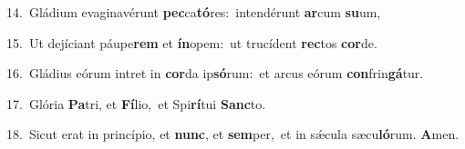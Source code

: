 {\numbfont\textcolor{\numbcolor}{14.}}~Gládium evaginavérunt \textbf{pec}\-ca\-\textbf{tó}\-res:~\star intendérunt \textbf{ar}\-cum \textbf{su}\-um,\par
{\numbfont\textcolor{\numbcolor}{15.}}~Ut dejíciant páupe\textbf{rem} et \textbf{ín}\-opem:~\star ut trucídent \textbf{rec}\-tos \textbf{cor}\-de.\par
{\numbfont\textcolor{\numbcolor}{16.}}~Gládius eórum intret in \textbf{cor}\-da ip\-\textbf{só}\-rum:~\star et arcus eórum \textbf{con}\-frin\-\textbf{gá}\-tur.\par
{\numbfont\textcolor{\numbcolor}{17.}}~Glória \textbf{Pa}\-tri, et \textbf{Fí}\-lio,~\star et Spi\-\textbf{rí}\-tui \textbf{Sanc}\-to.\par
{\numbfont\textcolor{\numbcolor}{18.}}~Sicut erat in princípio, et \textbf{nunc}\-, et \textbf{sem}\-per,~\star et in sǽcula sæcu\-\textbf{ló}\-rum. \textbf{A}\-men.\par
